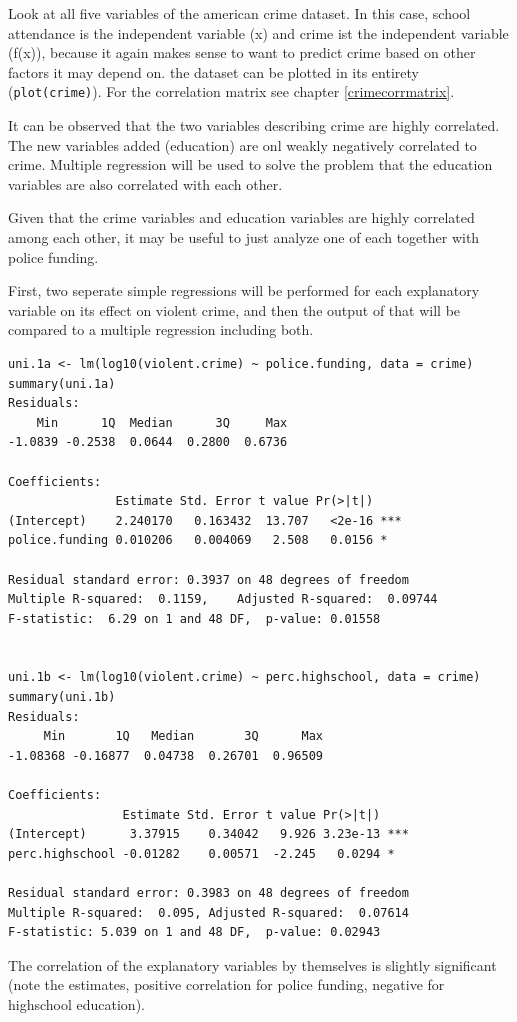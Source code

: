 \documentclass{article}
\begin{document}
Look at all five variables of the american crime dataset. In this case, school attendance is the independent variable (x) and crime ist the independent variable (f(x)), because it again makes sense to want to predict crime based on other factors it may depend on. the dataset can be plotted in its entirety (\texttt{plot(crime)}). For the correlation matrix see chapter \ref{crimecorrmatrix}.\par 
It can be observed that the two variables describing crime are highly correlated. The new variables added (education) are onl weakly negatively correlated to crime. Multiple regression will be used to solve the problem that the education variables are also correlated with each other.\par
Given that the crime variables and education variables are highly correlated among each other, it may be useful to just analyze one of each together with police funding.

First, two seperate simple regressions will be performed for each explanatory variable on its effect on violent crime, and then the output of that will be compared to a multiple regression including both.

\begin{lstlisting}
uni.1a <- lm(log10(violent.crime) ~ police.funding, data = crime)
summary(uni.1a)
Residuals:
    Min      1Q  Median      3Q     Max 
-1.0839 -0.2538  0.0644  0.2800  0.6736 

Coefficients:
               Estimate Std. Error t value Pr(>|t|)    
(Intercept)    2.240170   0.163432  13.707   <2e-16 ***
police.funding 0.010206   0.004069   2.508   0.0156 *  

Residual standard error: 0.3937 on 48 degrees of freedom
Multiple R-squared:  0.1159,	Adjusted R-squared:  0.09744 
F-statistic:  6.29 on 1 and 48 DF,  p-value: 0.01558


uni.1b <- lm(log10(violent.crime) ~ perc.highschool, data = crime)
summary(uni.1b)
Residuals:
     Min       1Q   Median       3Q      Max 
-1.08368 -0.16877  0.04738  0.26701  0.96509 

Coefficients:
                Estimate Std. Error t value Pr(>|t|)    
(Intercept)      3.37915    0.34042   9.926 3.23e-13 ***
perc.highschool -0.01282    0.00571  -2.245   0.0294 *  

Residual standard error: 0.3983 on 48 degrees of freedom
Multiple R-squared:  0.095,	Adjusted R-squared:  0.07614 
F-statistic: 5.039 on 1 and 48 DF,  p-value: 0.02943
\end{lstlisting}
The correlation of the explanatory variables by themselves is slightly significant (note the estimates, positive correlation for police funding, negative for highschool education).
\end{document}
